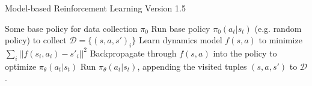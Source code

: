 \begin{algorithm}[t!]
\caption{Model-based Reinforcement Learning Version 1.5}
\begin{algorithmic}[1]
\label{alg:mb20}
\REQUIRE Some base policy for data collection $\pi_0$
\STATE Run base policy $\pi_0(a_t|s_t)$ (e.g. random policy) to collect $\mathcal{D} = \{(s,a,s')_i\}$
\STATE Learn dynamics model $f(s,a)$ to minimize $\sum_i\lvert|f(s_i,a_i)-s'_i|\rvert^2$
\STATE Backpropagate through $f(s,a)$ into the policy to optimize $\pi_\theta(a_t|s_t)$
\STATE Run $\pi_\theta(a_t|s_t)$, appending the visited tuples $(s,a,s')$ to $\mathcal{D}$.
\ENDWHILE
\end{algorithmic}
\end{algorithm}